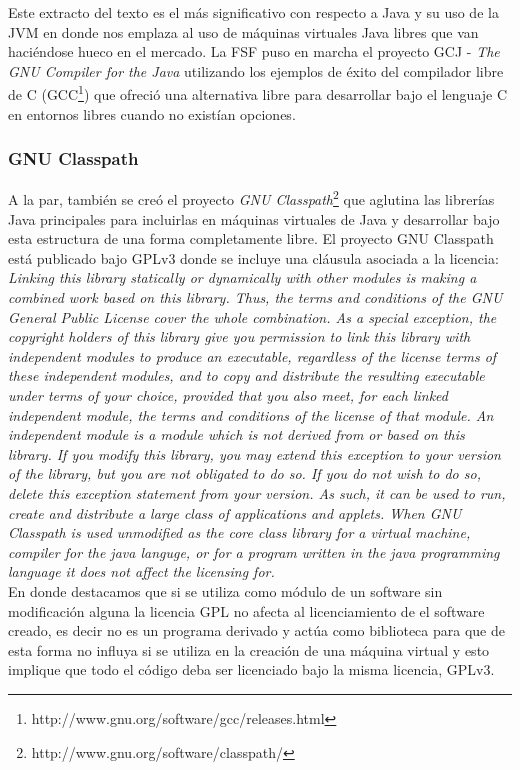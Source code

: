 \documentclass[11pt]{scrartcl}
\begin{document}
Este extracto del texto es el más significativo con respecto a Java y su uso de la JVM en donde nos emplaza al uso de máquinas virtuales Java libres que van haciéndose hueco en el mercado.
La FSF puso en marcha el proyecto GCJ - \emph{The GNU Compiler for the Java} utilizando los ejemplos de éxito del compilador libre de C (GCC\footnote{http://www.gnu.org/software/gcc/releases.html}) que ofreció una alternativa libre para desarrollar bajo el lenguaje C en entornos libres cuando no existían opciones.

\subsubsection{GNU Classpath}

A la par, también se creó el proyecto \emph{GNU Classpath}\footnote{http://www.gnu.org/software/classpath/} que aglutina las librerías Java principales para incluirlas en máquinas virtuales de Java y desarrollar bajo esta estructura de una forma completamente libre.
El proyecto GNU Classpath está publicado bajo GPLv3 donde se incluye una cláusula asociada a la licencia:\\

    \emph{Linking this library statically or dynamically with other modules is making a combined work based on this library. Thus, the terms and conditions of the GNU General Public License cover the whole combination.
As a special exception, the copyright holders of this library give you permission to link this library with independent modules to produce an executable, regardless of the license terms of these independent modules, and to copy and distribute the resulting executable under terms of your choice, provided that you also meet, for each linked independent module, the terms and conditions of the license of that module. An independent module is a module which is not derived from or based on this library. If you modify this library, you may extend this exception to your version of the library, but you are not obligated to do so. If you do not wish to do so, delete this exception statement from your version.
As such, it can be used to run, create and distribute a large class of applications and applets. When GNU Classpath is used unmodified as the core class library for a virtual machine, compiler for the java languge, or for a program written in the java programming language it does not affect the licensing for.}\\

En donde destacamos que si se utiliza como módulo de un software sin modificación alguna la licencia GPL no afecta al licenciamiento de el software creado, es decir no es un programa derivado y actúa como biblioteca para que de esta forma no influya si se utiliza en la creación de una máquina virtual y esto implique que todo el código deba ser licenciado bajo la misma licencia, GPLv3.
\end{document}
